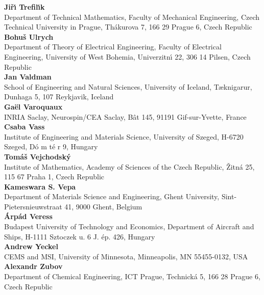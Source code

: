 \noindent
{\bf Ji\v r\'{\i} Trefil\'{\i}k}\\
Department of Technical Mathematics,
Faculty of Mechanical Engineering,
Czech Technical University in Prague,
Th\'akurova 7,
166 29 Prague 6,
Czech Republic\\

\noindent
{\bf Bohu\v{s} Ulrych}\\
Department of Theory of Electrical Engineering,
Faculty of Electrical Engineering,
University of West Bohemia,
Univerzitn\'{\i} 22,
306 14 Pilsen,
Czech Republic\\

\noindent
{\bf Jan Valdman}\\
School of Engineering and Natural Sciences,
University of Iceland,
T{\ae}knigar{\dh}ur,
Dunhaga 5,
107 Reykjavik,
Iceland\\

\noindent
{\bf Ga\" el Varoquaux}\\
INRIA Saclay,
Neurospin/CEA Saclay, B\^at 145,
91191 Gif-sur-Yvette,
France\\

\noindent
{\bf Csaba Vass}\\
Institute of Engineering and Materials Science,
University of Szeged,
H-6720 Szeged,
D\'o m t\'e r 9,
Hungary\\

\noindent
{\bf Tom\'a\v s Vejchodsk\'y}\\
Institute of Mathematics,
Academy of Sciences of the Czech Republic,
\v Zitn\'a 25,
115 67 Praha 1,
Czech Republic\\

\noindent
{\bf Kameswara S. Vepa}\\
Department of Materials Science and Engineering,
Ghent University,
Sint-Pietersnieuwstraat 41,
9000 Ghent,
Belgium\\

\noindent
{\bf \'Arp\'ad Veress}\\
Budapest University of Technology and Economics,
Department of Aircraft and Ships,
H-1111 Sztoczek u. 6 J. ép. 426,
Hungary\\

\noindent
{\bf Andrew Yeckel}\\
CEMS and MSI,
University of Minnesota,
Minneapolis,
MN 55455-0132,
USA\\

\noindent
{\bf Alexandr Zubov}\\
Department of Chemical Engineering,
ICT Prague,
Technick\'a 5,
166 28 Prague 6,
Czech Republic\\
